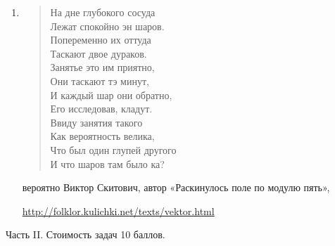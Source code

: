 \documentclass[12pt, a4paper]{article}\usepackage[]{graphicx}\usepackage[]{color}
\begin{document}
\begin{enumerate}
\item
\begin{flushleft}
\begin{verse}
На дне глубокого сосуда \\
Лежат спокойно эн шаров. \\
Попеременно их оттуда \\
Таскают двое дураков. \\
Занятье это им приятно, \\
Они таскают тэ минут, \\
И каждый шар они обратно, \\
Его исследовав, кладут. \\
Ввиду занятия такого \\
Как вероятность велика, \\
Что был один глупей другого \\
И что шаров там было ка?
\end{verse}
\end{flushleft}
вероятно Виктор Скитович, автор «Раскинулось поле по модулю пять»,

\url{http://folklor.kulichki.net/texts/vektor.html}

\end{enumerate}

Часть II. Стоимость задач 10 баллов.
\end{document}
